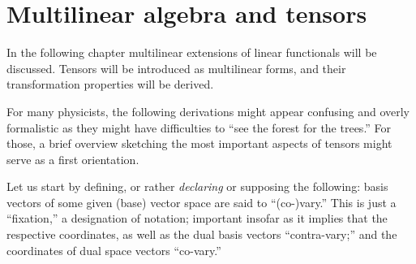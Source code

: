 \chapter{Multilinear algebra and tensors}
\label{ch:t}


In the following chapter multilinear extensions of linear functionals will be discussed.
Tensors will be introduced as multilinear forms,
and their transformation properties will be derived.


For many physicists, the following derivations might appear confusing and overly formalistic
as they might have difficulties to ``see the forest for the trees.''
For those, a brief overview sketching the most important aspects of tensors might serve as a first orientation.

Let us start by defining, or rather {\em declaring} or supposing the following:  basis vectors of some given (base) vector space are said to ``(co-)vary.''
This is just a ``fixation,'' a designation of notation;
important insofar as it implies that the respective coordinates, as well as the dual basis vectors ``contra-vary;''
and the coordinates of dual space vectors ``co-vary.''

